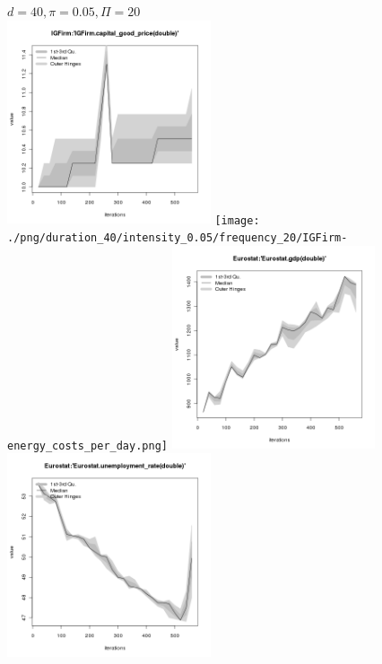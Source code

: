 \begin{figure}[ht!]
\centering\leavevmode
\begin{minipage}{13cm}
\centering\leavevmode
{$d=40, \pi=0.05, \Pi=20$}\\
\includegraphics[width=6cm]{./png/duration_40/intensity_0.05/frequency_20/IGFirm-capital_good_price.png}
\texttt{[image: ./png/duration\_40/intensity\_0.05/frequency\_20/IGFirm-energy\_costs\_per\_day.png]}
\includegraphics[width=6cm]{./png/duration_40/intensity_0.05/frequency_20/Eurostat-gdp.png}
\includegraphics[width=6cm]{./png/duration_40/intensity_0.05/frequency_20/Eurostat-unemployment_rate.png}
\end{minipage}
\end{figure}

